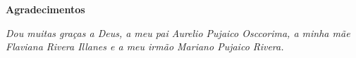 \cleardoublepage

\begin{center}
\Huge{\textbf{Agradecimentos}}
\end{center}

\null
\vfill
\thispagestyle{empty}

{\normalsize \it \hfill Dou muitas graças a Deus,
a meu pai Aurelio Pujaico Osccorima, a minha mãe Flaviana Rivera Illanes
e a meu irmão Mariano Pujaico Rivera.  \vspace*{4pt}}

\newpage
{} %


